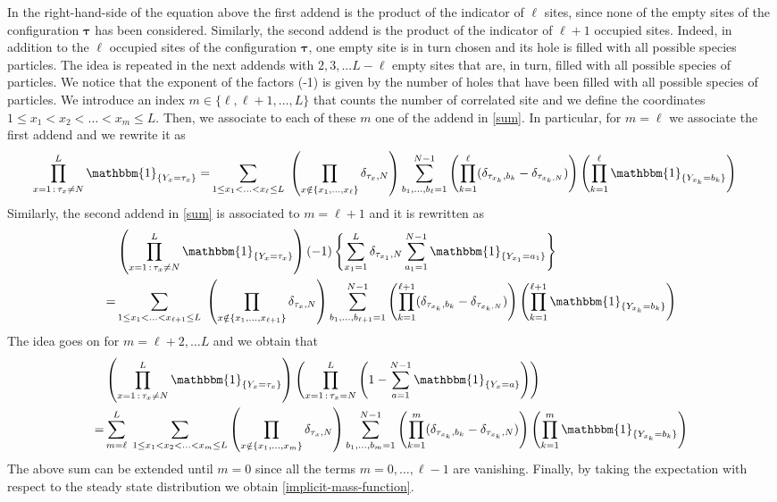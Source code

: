 \documentclass[10pt]{article}
\numberwithin{equation}{section}
\numberwithin{equation}{subsection}
\begin{document}
{In the right-hand-side of the equation above the first addend is the product of the indicator of $\ell$ sites, since none of the empty sites of the configuration $\bm{\tau}$ has been considered. Similarly, the second addend is the product of the indicator of $\ell+1$ occupied sites. Indeed, in addition to the $\ell$ occupied sites of the configuration $\bm{\tau}$, one empty site is in turn chosen and its hole is filled with all possible species particles. The idea is repeated in the next addends with $2,3,...L-\ell$ empty sites that are, in turn, filled with all possible species of particles. We notice that the exponent of the factors (-1) is given by the number of holes that have been filled with all possible species of particles. We introduce an index $m\in \{\ell,\ell+1,\ldots,L\}$ that counts the number of correlated site and we define the coordinates $1\leq x_{1}<x_{2}<\ldots<x_{m}\leq L$. Then, we associate to each of these $m$ one of the addend in \eqref{sum}. In particular, for $m=\ell$ we associate the first addend and we rewrite it as
	\begin{align}
		\prod_{x=1\,:\,\tau_{x}\neq N}^{L}\mathbbm{1}_{\{Y_{x}=\tau_{x}\}}=&
		\sum_{1\leq x_{1}<\ldots<x_{\ell}\leq L}\;\left(\prod_{x\notin \{x_{1},\ldots,x_{\ell}\}}\delta_{\tau_{x},N}\right)\sum_{b_{1},\ldots,b_{\ell}=1}^{N-1}\left(\prod_{k=1}^{\ell}(\delta_{\tau_{x_{k}},b_{k}}-\delta_{\tau_{x_{k},N}})\right)\left(\prod_{k=1}^{\ell}\mathbbm{1}_{\{Y_{x_{k}}=b_{k}\}}\right)
	\end{align}
	Similarly, the second addend in \eqref{sum} is associated to $m=\ell +1$ and it is rewritten as 
	\begin{align}
&\left(\prod_{x=1\,:\,\tau_{x}\neq N}^{L}\mathbbm{1}_{\{Y_x=\tau_{x}\}}\right)(-1)\left\{\sum_{x_{1}=1}^{L}\delta_{\tau_{x_{1}},N}\sum_{a_{1}=1}^{N-1}\mathbbm{1}_{\{Y_{x_{1}}
	=
	a_{1}\}}\right\}
			\\=&
		\sum_{1\leq x_{1}<\ldots<x_{\ell+1}\leq L}\;\left(\prod_{x\notin \{x_{1},\ldots,x_{\ell+1}\}}\delta_{\tau_{x},N}\right)\sum_{b_{1},\ldots,b_{\ell+1}=1}^{N-1}\left(\prod_{k=1}^{\ell+1}(\delta_{\tau_{x_{k}},b_{k}}-\delta_{\tau_{x_{k},N}})\right)\left(\prod_{k=1}^{\ell+1}\mathbbm{1}_{\{Y_{x_{k}}=b_{k}\}}\right)
	\end{align}
	The idea goes on for $m=\ell+2,\ldots L$ and we obtain that 
\begin{align}
&\left(\prod_{x=1\,:\,\tau_{x}\neq N}^{L}\mathbbm{1}_{\{Y_x=\tau_{x}\}}\right)\left(\prod_{x=1\,:\,\tau_{x}=N}^{L}\left(1-\sum_{a=1}^{N-1}\mathbbm{1}_{\{Y_x=a\}}\right)\right)\nonumber\\
=&
\sum_{m=\ell}^{L}\;\sum_{1\leq x_{1}<x_{2}<\ldots<x_{m}\leq L}\left(\prod_{x\notin\{x_{1},\ldots,x_{m}\}}\delta_{\tau_{x},N}\right)\sum_{b_{1},\ldots,b_{m}=1}^{N-1}\left(\prod_{k=1}^{m}(\delta_{\tau_{x_{k}},b_{k}}-\delta_{\tau_{x_{k}},N})\right)\left(\prod_{k=1}^{m}\mathbbm{1}_{\{Y_{x_{k}}=b_{k}\}}\right)
\end{align}
The above sum can be extended until $m=0$ since all the terms $m=0,\ldots,\ell-1$ are vanishing. 
Finally, by taking the expectation with respect to the steady state distribution we obtain \eqref{implicit-mass-function}.} 
\end{document}

